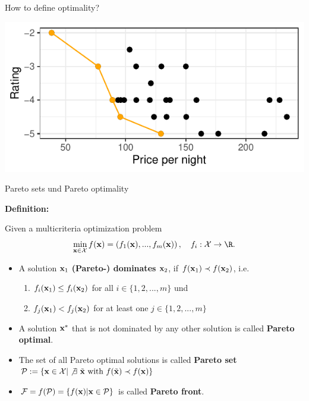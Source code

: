 \begin{frame}[allowframebreaks]{How to define optimality?}
\begin{itemize}
\vspace*{0.3cm}

\centering \includegraphics[width=0.8\linewidth]{images/expedia-5-1}



\end{itemize}

\end{frame}

\begin{frame}{Pareto sets und Pareto optimality}

\textbf{Definition:}

Given a multicriteria optimization problem $$\min_{\x \in \Xspace} f(\x) = \left(f_1(\x), ..., f_m(\x)\right), \quad f_i: \Xspace \to \R.$$

\begin{itemize}
\item A solution $\mathbf{x}_1$ \textbf{(Pareto-) dominates} $\mathbf{x}_2$, if $f(\mathbf{x}_1) \prec f(\mathbf{x}_2)$, i.e.
\begin{enumerate}
\item $f_i(\mathbf{x}_1) \le f_i(\mathbf{x}_2)$ for all $i \in \{1, 2, ..., m\}$ und
\item $f_j(\mathbf{x}_1) < f_j(\mathbf{x}_2)$ for at least one $j \in \{1, 2, ..., m\}$
\end{enumerate}
\vspace*{0.1cm}
\item A solution $\mathbf{x}^*$ that is not dominated by any other solution is called \textbf{Pareto optimal}.
\vspace*{0.1cm}
\item The set of all Pareto optimal solutions is called \textbf{Pareto set} $\mathcal{P} := \{\mathbf{x} \in \mathcal{X} |\not \exists ~\tilde{\mathbf{x}} \text{ with } f(\tilde{\mathbf{x}}) \prec f(\mathbf{x})\}$
\item $\mathcal{F} = f(\mathcal{P}) = \{f(\mathbf{x}) | \mathbf{x} \in \mathcal{P}\}$ is called \textbf{Pareto front}.
\end{itemize}

\end{frame}

